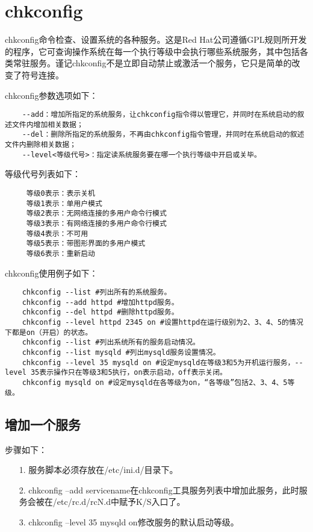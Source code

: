 \documentclass[a4paper,left=2.5cm,right=2.5cm,11pt]{article}
\begin{document}
\tableofcontents

\clearpage

\section{chkconfig}
	chkconfig命令检查、设置系统的各种服务。这是Red Hat公司遵循GPL规则所开发的程序，它可查询操作系统在每一个执行等级中会执行哪些系统服务，其中包括各类常驻服务。谨记chkconfig不是立即自动禁止或激活一个服务，它只是简单的改变了符号连接。\par

	chkconfig参数选项如下：
	\begin{lstlisting}
	--add：增加所指定的系统服务，让chkconfig指令得以管理它，并同时在系统启动的叙述文件内增加相关数据； 
	--del：删除所指定的系统服务，不再由chkconfig指令管理，并同时在系统启动的叙述文件内删除相关数据； 
	--level<等级代号>：指定读系统服务要在哪一个执行等级中开启或关毕。
	\end{lstlisting}

	等级代号列表如下：
	\begin{lstlisting}
	 等级0表示：表示关机 
	 等级1表示：单用户模式 
	 等级2表示：无网络连接的多用户命令行模式 
	 等级3表示：有网络连接的多用户命令行模式 
	 等级4表示：不可用 
	 等级5表示：带图形界面的多用户模式 
	 等级6表示：重新启动
	\end{lstlisting}

	chkconfig使用例子如下：
	\begin{lstlisting}
	chkconfig --list #列出所有的系统服务。 
	chkconfig --add httpd #增加httpd服务。 
	chkconfig --del httpd #删除httpd服务。 
	chkconfig --level httpd 2345 on #设置httpd在运行级别为2、3、4、5的情况下都是on（开启）的状态。 
	chkconfig --list #列出系统所有的服务启动情况。 
	chkconfig --list mysqld #列出mysqld服务设置情况。 
	chkconfig --level 35 mysqld on #设定mysqld在等级3和5为开机运行服务，--level 35表示操作只在等级3和5执行，on表示启动，off表示关闭。 
	chkconfig mysqld on #设定mysqld在各等级为on，“各等级”包括2、3、4、5等级。
	\end{lstlisting}

\subsection{增加一个服务}
	步骤如下：
	\begin{itemize}
		\item[1.] 服务脚本必须存放在/etc/ini.d/目录下。
		\item[2.] chkconfig --add servicename在chkconfig工具服务列表中增加此服务，此时服务会被在/etc/rc.d/rcN.d中赋予K/S入口了。
		\item[3.] chkconfig --level 35 mysqld on修改服务的默认启动等级。 
	\end{itemize}
\end{document}
